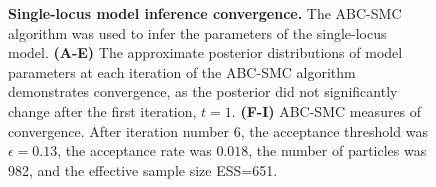 \documentclass[12pt]{extarticle}
\begin{document}
\begin{figure}[h]
\begin{subfigure}{1\textwidth}
     \label{fig:convergence-B}
  \end{subfigure}
    \caption{
    \textbf{Single-locus model inference convergence.} 
    The ABC-SMC algorithm was used to infer the parameters of the single-locus model. \textbf{(A-E)} The approximate posterior distributions of model parameters at each iteration of the ABC-SMC algorithm demonstrates convergence, as the posterior did not significantly change after the first iteration, $t=1$.
    \textbf{(F-I)} ABC-SMC measures of convergence. After iteration number 6, the acceptance threshold was $\epsilon=0.13$, the acceptance rate was $0.018$, the number of particles was 982, and the effective sample size ESS=651.
}
    \label{fig:convergence}
\end{figure}


\end{document}
